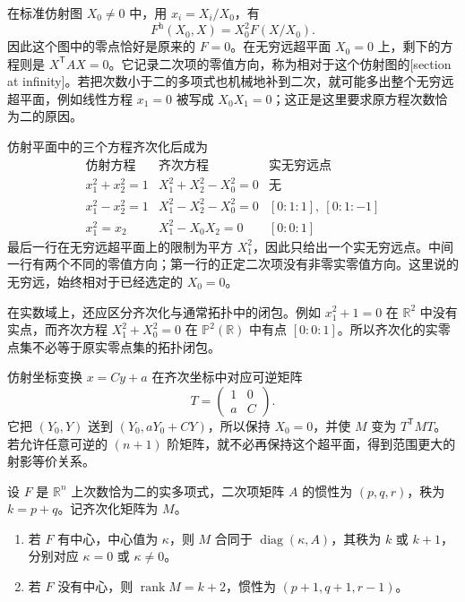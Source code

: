 在标准仿射图 \(X_0\ne0\) 中，用 \(x_i=X_i/X_0\)，有
\[
	F^{\mathrm h}(X_0,X)=X_0^2F(X/X_0).
\]
因此这个图中的零点恰好是原来的 \(F=0\)。在无穷远超平面 \(X_0=0\) 上，剩下的方程则是 \(X^{\mathsf T}AX=0\)。它记录二次项的零值方向，称为相对于这个仿射图的[section at infinity]。若把次数小于二的多项式也机械地补到二次，就可能多出整个无穷远超平面，例如线性方程 \(x_1=0\) 被写成 \(X_0X_1=0\)；这正是这里要求原方程次数恰为二的原因。

\begin{example}
	\label{g1:exm:conics-at-infinity}
	仿射平面中的三个方程齐次化后成为
	\[
		\begin{array}{c|c|c}
			\text{仿射方程}&\text{齐次方程}&\text{实无穷远点}\\ \hline
			x_1^2+x_2^2=1&X_1^2+X_2^2-X_0^2=0&\text{无}\\
			x_1^2-x_2^2=1&X_1^2-X_2^2-X_0^2=0&[0:1:1],\ [0:1:-1]\\
			x_1^2=x_2&X_1^2-X_0X_2=0&[0:0:1]
		\end{array}
	\]
	最后一行在无穷远超平面上的限制为平方 \(X_1^2\)，因此只给出一个实无穷远点。中间一行有两个不同的零值方向；第一行的正定二次项没有非零实零值方向。这里说的无穷远，始终相对于已经选定的 \(X_0=0\)。
\end{example}

在实数域上，还应区分齐次化与通常拓扑中的闭包。例如 \(x_1^2+1=0\) 在 \(\mathbb R^2\) 中没有实点，而齐次方程 \(X_1^2+X_0^2=0\) 在 \(\mathbb P^2(\mathbb R)\) 中有点 \([0:0:1]\)。所以齐次化的实零点集不必等于原实零点集的拓扑闭包。

\ProseParagraphBreak

仿射坐标变换 \(x=Cy+a\) 在齐次坐标中对应可逆矩阵
\[
	T=\begin{pmatrix}1&0\\a&C\end{pmatrix}.
\]
它把 \((Y_0,Y)\) 送到 \((Y_0,aY_0+CY)\)，所以保持 \(X_0=0\)，并使 \(M\) 变为 \(T^{\mathsf T}MT\)。若允许任意可逆的 \((n+1)\) 阶矩阵，就不必再保持这个超平面，得到范围更大的射影等价关系。

\begin{proposition}
	\label{g1:prop:homogenized-rank}
	设 \(F\) 是 \(\mathbb R^n\) 上次数恰为二的实多项式，二次项矩阵 \(A\) 的惯性为 \((p,q,r)\)，秩为 \(k=p+q\)。记齐次化矩阵为 \(M\)。
	\begin{enumerate}
		\item 若 \(F\) 有中心，中心值为 \(\kappa\)，则 \(M\) 合同于 \(\operatorname{diag}(\kappa,A)\)，其秩为 \(k\) 或 \(k+1\)，分别对应 \(\kappa=0\) 或 \(\kappa\ne0\)。
		\item 若 \(F\) 没有中心，则 \(\operatorname{rank}M=k+2\)，惯性为 \((p+1,q+1,r-1)\)。
	\end{enumerate}
\end{proposition}

